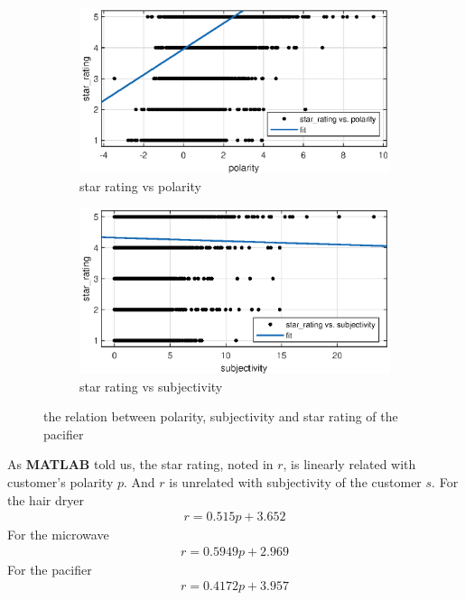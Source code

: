 \documentclass[12pt]{article}  %
\begin{document}
\begin{figure}[H]
  \centering
  \begin{subfigure}{.5\textwidth}
    \centering
    \includegraphics[width=\linewidth]{figures/pacifier/polarity_vs_star_rating.eps}
    \caption{star rating vs polarity}
    \label{fig:}
  \end{subfigure}%
  \begin{subfigure}{.5\textwidth}
    \centering
    \includegraphics[width=\linewidth]{figures/pacifier/subjectivity_vs_star_rating.eps}
    \caption{star rating vs subjectivity}
    \label{fig:}
  \end{subfigure}
  \caption{the relation between polarity, subjectivity and star rating of the pacifier}
  \label{fig:}
\end{figure}
As \textbf{MATLAB} told us, the star rating, noted in $r$, is linearly related with customer's polarity $p$. And $r$ is unrelated with subjectivity of the customer $s$. For the hair dryer
\begin{equation*}
  \begin{aligned}
    r = 0.515 p + 3.652
  \end{aligned}
\end{equation*}
For the microwave
\begin{equation*}
  \begin{aligned}
    r = 0.5949 p + 2.969
  \end{aligned}
\end{equation*}
For the pacifier
\begin{equation*}
  \begin{aligned}
    r = 0.4172 p + 3.957
  \end{aligned}
\end{equation*}
\end{document}
